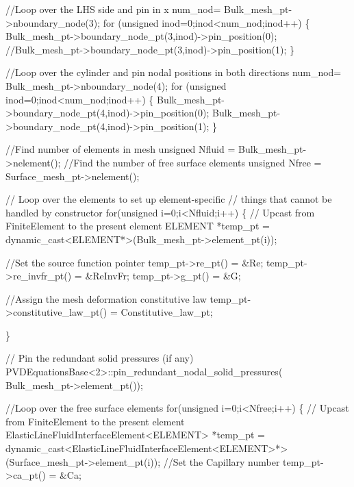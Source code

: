 \begin{DoxyCodeInclude}
  
 \textcolor{comment}{//Loop over the LHS side and pin in x}
  num\_nod= Bulk\_mesh\_pt->nboundary\_node(3);
 \textcolor{keywordflow}{for} (\textcolor{keywordtype}{unsigned} inod=0;inod<num\_nod;inod++)
  \{
   Bulk\_mesh\_pt->boundary\_node\_pt(3,inod)->pin\_position(0);
   \textcolor{comment}{//Bulk\_mesh\_pt->boundary\_node\_pt(3,inod)->pin\_position(1);}
  \}
 
 \textcolor{comment}{//Loop over the cylinder and pin nodal positions in both directions}
 num\_nod= Bulk\_mesh\_pt->nboundary\_node(4);
 \textcolor{keywordflow}{for} (\textcolor{keywordtype}{unsigned} inod=0;inod<num\_nod;inod++)
  \{
   Bulk\_mesh\_pt->boundary\_node\_pt(4,inod)->pin\_position(0);
   Bulk\_mesh\_pt->boundary\_node\_pt(4,inod)->pin\_position(1);
  \}


 \textcolor{comment}{//Find number of elements in mesh}
 \textcolor{keywordtype}{unsigned} Nfluid = Bulk\_mesh\_pt->nelement();
 \textcolor{comment}{//Find the number of free surface elements}
 \textcolor{keywordtype}{unsigned} Nfree = Surface\_mesh\_pt->nelement();

    \textcolor{comment}{// Loop over the elements to set up element-specific }
    \textcolor{comment}{// things that cannot be handled by constructor}
    \textcolor{keywordflow}{for}(\textcolor{keywordtype}{unsigned} i=0;i<Nfluid;i++)
     \{
      \textcolor{comment}{// Upcast from FiniteElement to the present element}
      ELEMENT *temp\_pt = \textcolor{keyword}{dynamic\_cast<}ELEMENT*\textcolor{keyword}{>}(Bulk\_mesh\_pt->element\_pt(i));
      
      \textcolor{comment}{//Set the source function pointer}
      temp\_pt->re\_pt() = &Re;
      temp\_pt->re\_invfr\_pt() = &ReInvFr;
      temp\_pt->g\_pt() = &G;
      
      \textcolor{comment}{//Assign the mesh deformation constitutive law}
      temp\_pt->constitutive\_law\_pt() = Constitutive\_law\_pt;
      
     \}
    
    
    \textcolor{comment}{// Pin the redundant solid pressures (if any)}
    PVDEquationsBase<2>::pin\_redundant\_nodal\_solid\_pressures(
     Bulk\_mesh\_pt->element\_pt());
    
    \textcolor{comment}{//Loop over the free surface elements}
    \textcolor{keywordflow}{for}(\textcolor{keywordtype}{unsigned} i=0;i<Nfree;i++)
     \{
      \textcolor{comment}{// Upcast from FiniteElement to the present element}
      ElasticLineFluidInterfaceElement<ELEMENT> *temp\_pt = 
       \textcolor{keyword}{dynamic\_cast<}ElasticLineFluidInterfaceElement<ELEMENT>*\textcolor{keyword}{>}
       (Surface\_mesh\_pt->element\_pt(i));
      \textcolor{comment}{//Set the Capillary number}
      temp\_pt->ca\_pt() = &Ca;
      

\end{DoxyCodeInclude}
